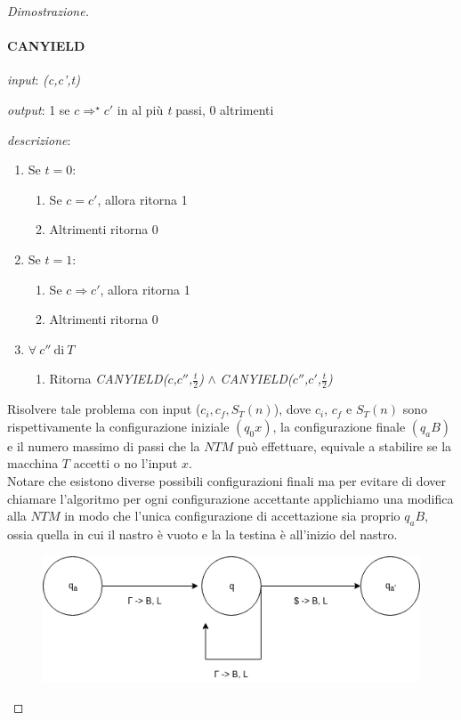 \begin{proof}[Dimostrazione]
\paragraph{CANYIELD}
\begin{description}
	\item \textit{input}: \emph{(c,c',t)}
	\item \textit{output}: 1 se $c \Rightarrow^{\star} c'$ in al più \emph{t} passi, 0 altrimenti
	\item \textit{descrizione}:
	\begin{enumerate}[label*=\arabic*.]
		\item Se $t = 0$:
		\begin{enumerate}[label*=\arabic*.]
			\item Se $c = c'$, allora ritorna 1 
			\item Altrimenti ritorna 0 
		\end{enumerate}
		\item Se $t=1$:
			\begin{enumerate}[label*=\arabic*.]
				\item Se $c \Rightarrow c'$, allora ritorna 1
				\item Altrimenti ritorna 0
			\end{enumerate}
		\item $\forall \ c'' \ \text{di} \ T$
			\begin{enumerate}[label*=\arabic*.]
				\item Ritorna \emph{CANYIELD($c$,$c''$,$\frac{t}{2}$)} $\land$ \emph{CANYIELD($c''$,$c'$,$\frac{t}{2}$)}
			\end{enumerate}
	\end{enumerate}
\end{description}
Risolvere tale problema con input ($c_i,c_f,S_T(n)$), dove $c_i$, $c_f$ e $S_T(n)$ sono rispettivamente la configurazione iniziale $(q_0x)$, la configurazione finale $(q_aB)$ e il numero massimo di passi che la $NTM$ può effettuare, equivale a stabilire se la macchina $T$ accetti o no l'input $x$. \\
Notare che esistono diverse possibili configurazioni finali ma per evitare di dover chiamare l'algoritmo per ogni configurazione accettante applichiamo una modifica alla $NTM$ in modo che l'unica configurazione di accettazione sia proprio $q_aB$, ossia quella in cui il nastro è vuoto e la la testina è all'inizio del nastro.
\begin{figure}[H]
    \centering
    \includegraphics[scale=0.6]{modifica}
\end{figure}


\end{proof}
